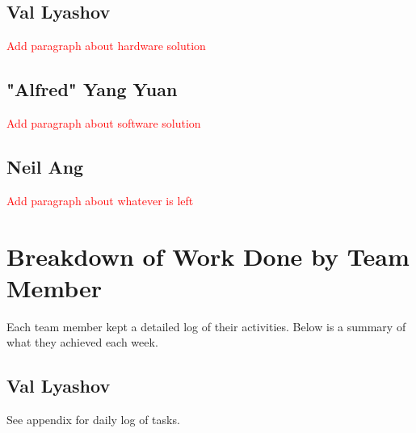 \documentclass[11pt,a4paper,titlepage]{report}
\begin{document}
\subsection{Val Lyashov}

\textcolor{red}{Add paragraph about hardware solution}

\subsection{"Alfred" Yang Yuan}

\textcolor{red}{Add paragraph about software solution}

\subsection{Neil Ang}

\textcolor{red}{Add paragraph about whatever is left}


\section{Breakdown of Work Done by Team Member}

Each team member kept a detailed log of their activities. Below is a summary of what they achieved each week.

\subsection{Val Lyashov}

See appendix for daily log of tasks.
\end{document}

